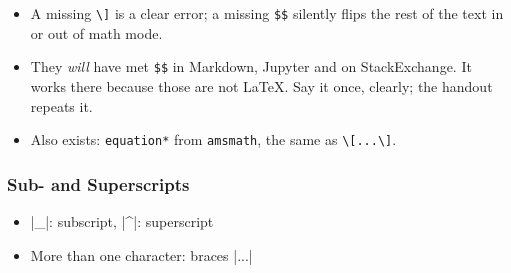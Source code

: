 \begin{frame}[fragile]
{\begin{itemize}
                (e.g.\ an extra empty line above it after a paragraph break),
                the class option \texttt{fleqn} (left-aligned equations) ignores it,
                and \texttt{amsmath} features such as \texttt{\textbackslash tag} do not work inside it.
            \item A missing \texttt{\textbackslash]} is a clear error;
                a missing \texttt{\$\$} silently flips the rest of the text in or out of math mode.
            \item They \emph{will} have met \texttt{\$\$} in Markdown, Jupyter and on StackExchange.
                It works there because those are not \LaTeX{}.
                Say it once, clearly; the handout repeats it.
            \item Also exists: \texttt{equation*} from \texttt{amsmath}, the same as \texttt{\textbackslash[...\textbackslash]}.
        \end{itemize}
    }
\end{frame}

\begin{frame}[fragile]
    \frametitle{Sub- and Superscripts}
    \begin{itemize}
        \item<1-> \code|_|: subscript, \code|^|: superscript
        \item<3-> More than one character: braces \code|{...}|
    \end{itemize}
    \vfill
    \begin{overprint}
    \end{overprint}
    \vfill
\end{frame}


